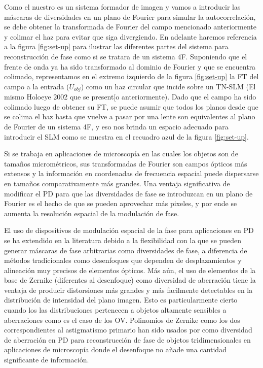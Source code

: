 Como el nuestro es un sistema formador de imagen y vamos a introducir las
máscaras de diversidades en un plano de Fourier para simular la autocorrelación, se debe obtener la
transformada de Fourier del campo mencionado anteriormente y colimar
el haz para evitar que siga divergiendo. En adelante haremos
referencia a la figura \ref{fig:set-up} para ilustrar las diferentes
partes del sistema para reconstrucción de fase como si se tratara de
un sistema 4F.
Suponiendo que el frente de onda ya ha sido transformado al dominio de Fourier y que se
encuentra colimado, representamos en el extremo izquierdo de la figura
\ref{fig:set-up} la FT del campo a la entrada ($U_{obj}$) como un haz
circular que incide sobre un TN-SLM (El mismo Holoeye 2002 que se
present[o anteriormente).  Dado que el campo ha sido
colimado luego de obtener su FT, se puede asumir que todos los planos desde que
se colima el haz hasta que vuelve a pasar por una lente son
equivalentes al plano de Fourier de un sistema 4F, y eso nos brinda un
espacio adecuado para introducir el SLM como se muestra en el recuadro
azul de la figura \ref{fig:set-up}. 

Si se trabaja en aplicaciones de microscopía en las cuales los objetos
son de tamaños micrométricos, sus transformadas de Fourier son campos
ópticos más extensos y la información en coordenadas de frecuencia
espacial puede dispersarse en tamaños comparativamente más
grandes. Una ventaja significativa de modificar el PD para que las
diversidades de fase se introduzcan en un plano de Fourier es el hecho
de que se pueden aprovechar más pixeles, y por ende se aumenta la
resolución espacial de la modulación de fase. 


El uso de dispositivos de modulación espacial de la fase para
aplicaciones en PD se ha extendido en la literatura
debido a la flexibilidad con la que se pueden generar máscaras de fase
arbitrarias como diversidades de fase, a diferencia de métodos
tradicionales como desenfoques que dependen de desplazamientos y alineación muy
precisos de elementos ópticos. Más aún, el uso de elementos de
la base de Zernike (diferentes al desenfoque) como diversidad de aberración tiene la ventaja de
producir distorsiones más grandes y más facilmente detectables en la
distribución de intensidad del plano imagen. Esto es particularmente
cierto cuando los las distribuciones pertenecen a objetos altamente
sensibles a aberraciones como es el caso de los OV. Polinomios de
Zernike como los dos correspondientes al astigmatismo primario han
sido usados por  como diversidad de aberración en PD para reconstrucción de
fase de objetos tridimensionales en aplicaciones de microscopía donde
el desenfoque no añade una cantidad significante de información. 
 
